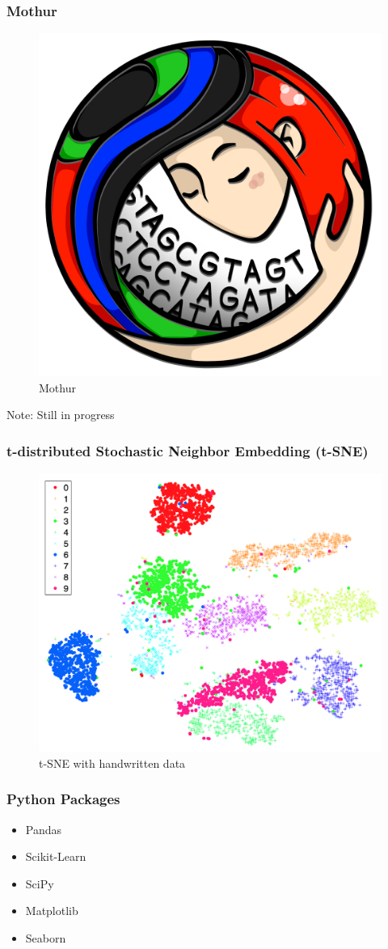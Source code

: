\documentclass{beamer}
\begin{document}
    \begin{frame}
        \frametitle{Mothur}

        \begin{figure}[h!]
            \includegraphics[width=0.3 \linewidth]{figures/mothur.png}
            \caption{Mothur}
        \end{figure}

        Note: Still in progress
    \end{frame}

    \begin{frame}
        \frametitle{t-distributed Stochastic Neighbor Embedding (t-SNE)}

        \begin{figure}[h!]
            \includegraphics[width=0.6 \linewidth]{figures/tsne.png}
            \caption{t-SNE with handwritten data \protect \cite{tsne1}}
        \end{figure}
    \end{frame}

    \begin{frame}
        \frametitle{Python Packages}

        \begin{itemize}
            \item Pandas \cite{pandas1}
            \item Scikit-Learn \cite{sklearn1}
            \item SciPy \cite{scipy1}
            \item Matplotlib \cite{matplotlib1}
            \item Seaborn \cite{seaborn1}
        \end{itemize}
    \end{frame}
\end{document}

